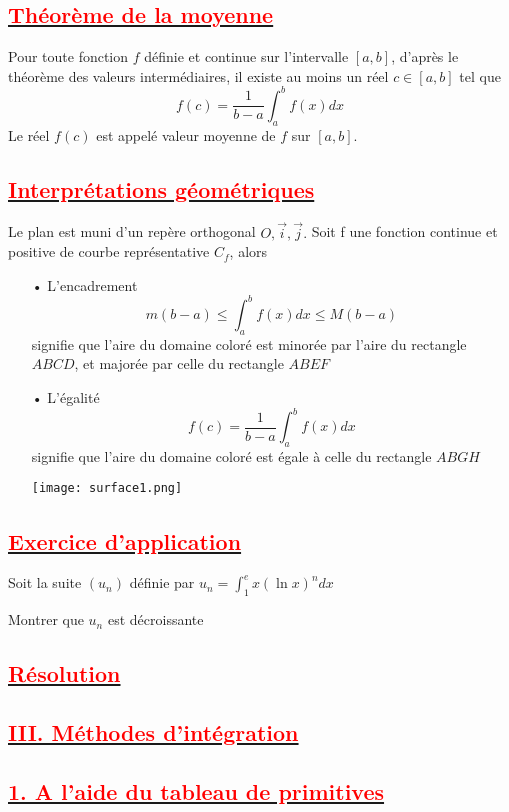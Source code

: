 \documentclass[12pt]{article}
\begin{document}
\subsection*{\underline{\textbf{\textcolor{red}{Théorème de la moyenne }}}}
Pour toute fonction $f$ définie et continue sur l'intervalle $[a, b]$, d'après le théorème des valeurs intermédiaires, il existe au moins un réel $c\in [a, b]$ tel que
\[f(c) =\frac{1}{b-a}\int_{a}^{b}f(x)dx \]
Le réel $f(c)$ est appelé valeur moyenne de $f$ sur $[a, b]$.
\subsection*{\underline{\textbf{\textcolor{red}{Interprétations géométriques }}}}
Le plan est muni d'un repère orthogonal  $O,\vec{i},\vec{j}.$ Soit f une fonction continue et positive de courbe représentative $C_{f}$, alors
\begin{itemize}
\item[•] L'encadrement \[m(b-a)\leq \int_{a}^{b}f(x)dx \leq M(b-a)\] signifie que l'aire du domaine coloré est minorée par l'aire du rectangle $ABCD$, et majorée par celle du rectangle $ABEF$
\item[•]  L'égalité \[f(c) =\frac{1}{b-a}\int_{a}^{b}f(x)dx \] signifie que l'aire du domaine coloré est égale à celle du rectangle $ABGH$

\begin{center}
   \texttt{[image: surface1.png]}
\end{center}

\end{itemize}
\subsection*{\underline{\textbf{\textcolor{red}{Exercice d'application }}}}
Soit la suite $(u_{n})$ définie par $u_{n}=\int_{1}^{e}x(\ln x)^{n}dx$

Montrer que $u_{n}$ est décroissante
\subsection*{\underline{\textbf{\textcolor{red}{Résolution  }}}}
\subsection*{\underline{\textbf{\textcolor{red}{III. Méthodes d'intégration }}}}
\subsection*{\underline{\textbf{\textcolor{red}{1. A l'aide du tableau de primitives }}}}
\end{document}
